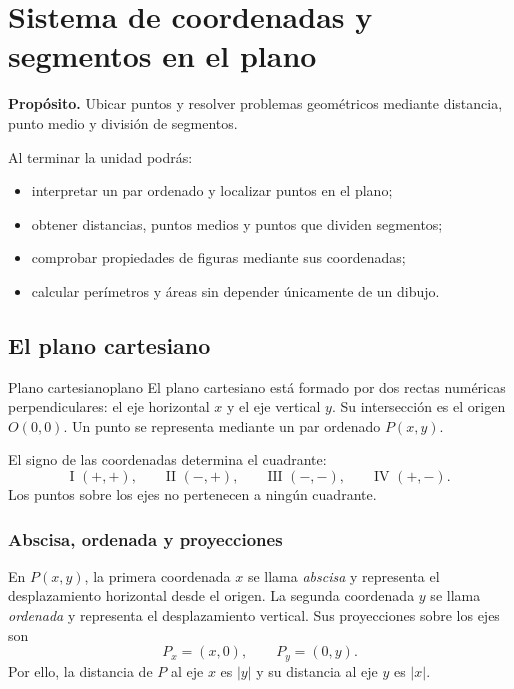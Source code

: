\chapter{Sistema de coordenadas y segmentos en el plano}

\begin{center}
\begin{minipage}{.88\textwidth}
\small\sffamily
\textbf{Propósito.} Ubicar puntos y resolver problemas geométricos mediante
distancia, punto medio y división de segmentos.
\end{minipage}
\end{center}

\begin{properties}
Al terminar la unidad podrás:
\begin{itemize}
  \item interpretar un par ordenado y localizar puntos en el plano;
  \item obtener distancias, puntos medios y puntos que dividen segmentos;
  \item comprobar propiedades de figuras mediante sus coordenadas;
  \item calcular perímetros y áreas sin depender únicamente de un dibujo.
\end{itemize}
\end{properties}

\section{El plano cartesiano}

\begin{definition}{Plano cartesiano}{plano}
El plano cartesiano está formado por dos rectas numéricas perpendiculares: el
eje horizontal $x$ y el eje vertical $y$. Su intersección es el origen
$O(0,0)$. Un punto se representa mediante un par ordenado $P(x,y)$.
\end{definition}

El signo de las coordenadas determina el cuadrante:
\[
\text{I }(+,+),\qquad \text{II }(-,+),\qquad
\text{III }(-,-),\qquad \text{IV }(+,-).
\]
Los puntos sobre los ejes no pertenecen a ningún cuadrante.

\subsection{Abscisa, ordenada y proyecciones}

En $P(x,y)$, la primera coordenada $x$ se llama \emph{abscisa} y representa
el desplazamiento horizontal desde el origen. La segunda coordenada $y$ se
llama \emph{ordenada} y representa el desplazamiento vertical. Sus
proyecciones sobre los ejes son
\[
P_x=(x,0),\qquad P_y=(0,y).
\]
Por ello, la distancia de $P$ al eje $x$ es $|y|$ y su distancia al eje $y$
es $|x|$.

